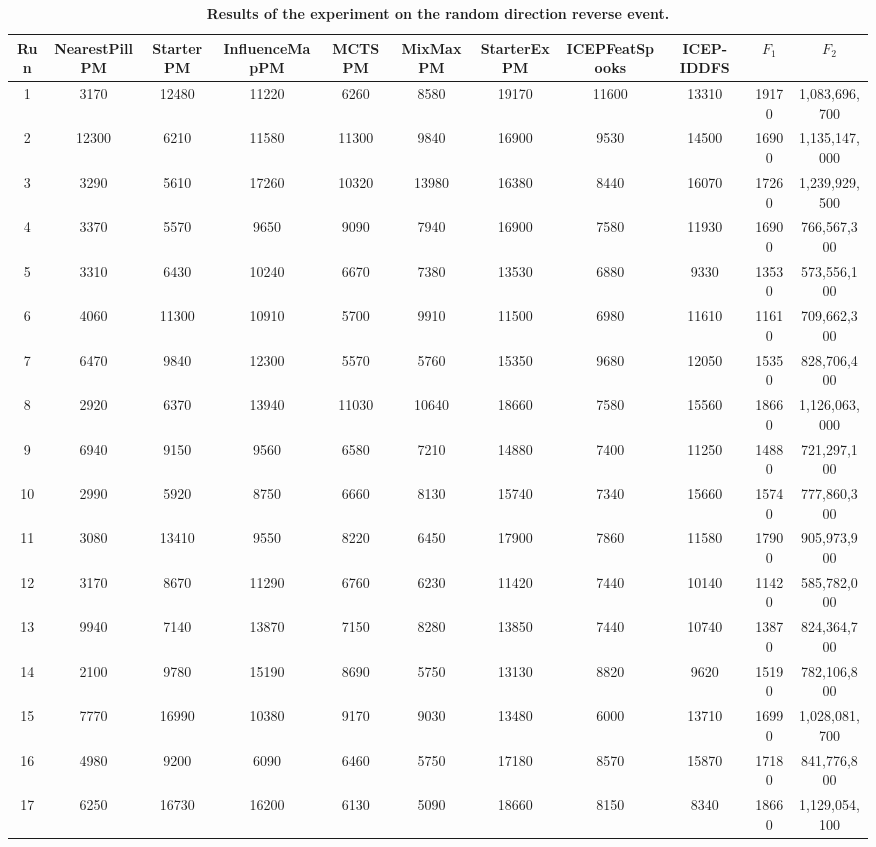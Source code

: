 \documentclass[journal]{IEEEtran}
\begin{document}
\begin{table}
\caption{\textbf{Results of the experiment on the random direction reverse event.}}
\label{tab:results_robust}
\centering
\footnotesize
\begin{tabular}{|c|cccccccc|cc|}
\hline
Run	&	NearestPillPM	&	StarterPM	&	InfluenceMapPM	&	MCTSPM	&	MixMaxPM	&	StarterExPM	&	ICEPFeatSpooks	&	ICEP-IDDFS	&	$F_1$	&	$F_2$	\\
\hline
1	&	3170	&	12480	&	11220	&	6260	&	8580	&	19170	&	11600	&	13310	&	19170	&	1,083,696,700	\\
2	&	12300	&	6210	&	11580	&	11300	&	9840	&	16900	&	9530	&	14500	&	16900	&	1,135,147,000	\\
3	&	3290	&	5610	&	17260	&	10320	&	13980	&	16380	&	8440	&	16070	&	17260	&	1,239,929,500	\\
4	&	3370	&	5570	&	9650	&	9090	&	7940	&	16900	&	7580	&	11930	&	16900	&	766,567,300	\\
5	&	3310	&	6430	&	10240	&	6670	&	7380	&	13530	&	6880	&	9330	&	13530	&	573,556,100	\\
6	&	4060	&	11300	&	10910	&	5700	&	9910	&	11500	&	6980	&	11610	&	11610	&	709,662,300	\\
7	&	6470	&	9840	&	12300	&	5570	&	5760	&	15350	&	9680	&	12050	&	15350	&	828,706,400	\\
8	&	2920	&	6370	&	13940	&	11030	&	10640	&	18660	&	7580	&	15560	&	18660	&	1,126,063,000	\\
9	&	6940	&	9150	&	9560	&	6580	&	7210	&	14880	&	7400	&	11250	&	14880	&	721,297,100	\\
10	&	2990	&	5920	&	8750	&	6660	&	8130	&	15740	&	7340	&	15660	&	15740	&	777,860,300	\\
11	&	3080	&	13410	&	9550	&	8220	&	6450	&	17900	&	7860	&	11580	&	17900	&	905,973,900	\\
12	&	3170	&	8670	&	11290	&	6760	&	6230	&	11420	&	7440	&	10140	&	11420	&	585,782,000	\\
13	&	9940	&	7140	&	13870	&	7150	&	8280	&	13850	&	7440	&	10740	&	13870	&	824,364,700	\\
14	&	2100	&	9780	&	15190	&	8690	&	5750	&	13130	&	8820	&	9620	&	15190	&	782,106,800	\\
15	&	7770	&	16990	&	10380	&	9170	&	9030	&	13480	&	6000	&	13710	&	16990	&	1,028,081,700	\\
16	&	4980	&	9200	&	6090	&	6460	&	5750	&	17180	&	8570	&	15870	&	17180	&	841,776,800	\\
17	&	6250	&	16730	&	16200	&	6130	&	5090	&	18660	&	8150	&	8340	&	18660	&	1,129,054,100	\\

\end{tabular}
\end{table}
\end{document}
